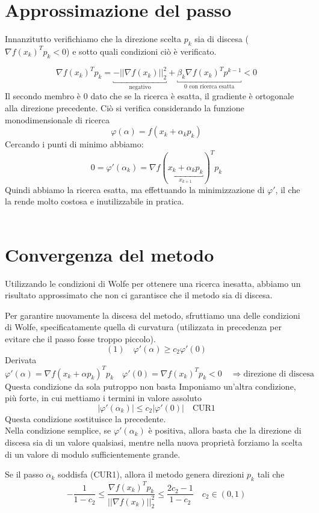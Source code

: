 \section{Approssimazione del passo}

Innanzitutto verifichiamo che la direzione scelta $p_{k}$ sia di
discesa ($\nabla f(x_{k})^{T} p_{k} < 0$) e sotto quali condizioni ciò
\`e verificato.

$$ \nabla f(x_{k})^{T} p_{k} = \underbracket{- || \nabla f(x_{k})||_{2}^{2}}_{\text{negativo}} + 
    \underbracket{\beta_{k} \nabla f(x_{k})^{T} p^{k-1}}_{\text{0 con
ricerca esatta}} < 0
$$
Il secondo membro \`e 0 dato che se la ricerca \`e esatta, il gradiente \`e
ortogonale alla direzione precedente. Ciò si verifica considerando la
funzione monodimensionale di ricerca
$$ \varphi(\alpha) = f(x_{k}+ \alpha_k p_{k})$$
Cercando i punti di minimo abbiamo:
$$ 0 = \varphi'(\alpha_{k}) = \nabla f(\underbracket{x_{k} + \alpha_{k}p_{k}}_{x_{k+1}})^{T} p_{k}$$
Quindi abbiamo la ricerca esatta, ma effettuando la minimizzazione di
$\varphi'$, il che la rende molto costosa e inutilizzabile in pratica.
\\ \\

\section{Convergenza del metodo} 
Utilizzando le condizioni di Wolfe
per ottenere una ricerca inesatta, abbiamo un risultato approssimato
che non ci garantisce che il metodo sia di discesa.

Per garantire nuovamente la discesa del metodo, sfruttiamo una delle
condizioni di Wolfe, specificatamente quella di curvatura (utilizzata
in precedenza per evitare che il passo fosse troppo piccolo).
$$(1) \quad  \varphi'( \alpha ) \geq c_2 \varphi'(0)$$
Derivata
$$\varphi'(\alpha) = \nabla f(x_{k} + \alpha p_{k})^{T} p_{k} \quad
 \varphi'(0) = \nabla f(x_{k})^{T} p_{k} < 0 \quad \Rightarrow \text{
direzione di discesa} $$ Questa condizione da sola putroppo non basta
Imponiamo un'altra condizione, più forte, in cui mettiamo i termini in
valore assoluto
 $$ | \varphi'(\alpha_{k})| \leq c_{2} | \varphi'(0) | \quad \text{CUR1}$$
Questa condizione sostituisce la precedente.  \\ Nella condizione
semplice, se $\varphi'(\alpha_{k}) $ \`e positiva, allora basta che la
direzione di discesa sia di un valore qualsiasi, mentre nella nuova
proprietà forziamo la scelta di un valore di modulo sufficientemente
grande.
\begin{lemma} Se il passo $\alpha_{k}$ soddisfa (CUR1), allora il
metodo genera direzioni $p_{k}$ tali che
$$ 
-\frac{1}{1-c_{2}} \leq \frac{\nabla f(x_{k})^{T} p_{k} }{||\nabla
f(x_{k})||_{2}^{2}} \leq \frac{2 c_{2} -1 }{1-c_{2}} \quad c_{2} \in (0,1)
$$
\end{lemma}

